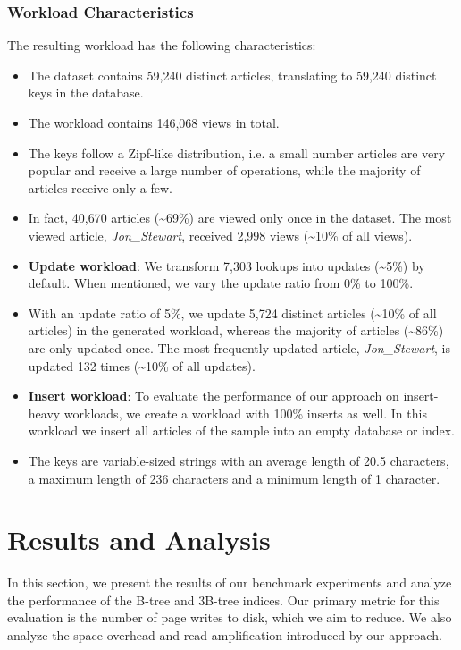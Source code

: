 \subsubsection*{Workload Characteristics}
\label{sec:workload-characteristics}
The resulting workload has the following characteristics:
\begin{itemize}
    \item The dataset contains 59,240 distinct articles, translating to 59,240 distinct keys in the database.
    \item The workload contains 146,068 views in total.
    \item The keys follow a Zipf-like distribution, i.e. a small number articles are very popular and receive a large number of operations, while the majority of articles receive only a few. 
    \item In fact, 40,670 articles (\textasciitilde69\%) are viewed only once in the dataset. 
    The most viewed article, \textit{Jon\_Stewart}, received 2,998 views (\textasciitilde10\% of all views).
    \item \textbf{Update workload}: We transform 7,303 lookups into updates (\textasciitilde5\%) by default. When mentioned, we vary the update ratio from 0\% to 100\%.
    \item With an update ratio of 5\%, we update 5,724 distinct articles (\textasciitilde10\% of all articles) in the generated workload, whereas the majority of articles (\textasciitilde86\%) are only updated once.
    The most frequently updated article, \textit{Jon\_Stewart}, is updated 132 times (\textasciitilde10\% of all updates).
    \item \textbf{Insert workload}: To evaluate the performance of our approach on insert-heavy workloads, we create a workload with 100\% inserts as well.
    In this workload we insert all articles of the sample into an empty database or index.
    \item The keys are variable-sized strings with an average length of 20.5 characters, a maximum length of 236 characters and a minimum length of 1 character.
\end{itemize}

\section{Results and Analysis}
In this section, we present the results of our benchmark experiments and analyze the performance of the B-tree and 3B-tree indices.
Our primary metric for this evaluation is the number of page writes to disk, which we aim to reduce.
We also analyze the space overhead and read amplification introduced by our approach.

